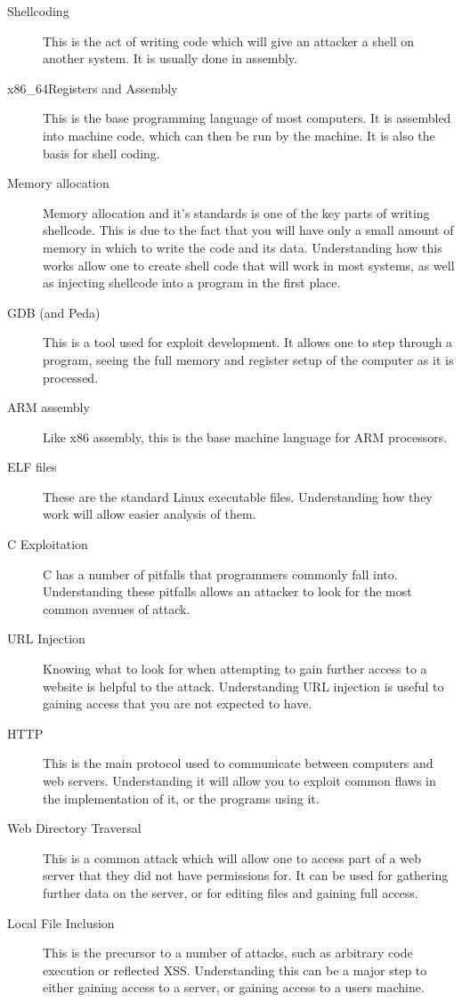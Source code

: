 \documentclass[twoside,a4paper,11pt]{report}
\begin{document}
			\begin{description}
				\item[Shellcoding]
					This is the act of writing code which will give an attacker a shell on another system. 
					It is usually done in assembly. 
				\item[x86\_64Registers and Assembly] 
					This is the base programming language of most computers. 
					It is assembled into machine code, which can then be run by the machine. 
					It is also the basis for shell coding. 
				\item[Memory allocation] 
					Memory allocation and it's standards is one of the key parts of writing shellcode. 
					This is due to the fact that you will have only a small amount of memory in which to write the code and its data. 
					Understanding how this works allow one to create shell code that will work in most systems, as well as injecting shellcode into a program in the first place. 
				\item[GDB (and Peda)]
					This is a tool used for exploit development. 
					It allows one to step through a program, seeing the full memory and register setup of the computer as it is processed. 
				\item[ARM assembly]
					Like x86 assembly, this is the base machine language for ARM processors. 
				\item[ELF files]
					These are the standard Linux executable files. 
					Understanding how they work will allow easier analysis of them. 
				\item[C Exploitation]
					C has a number of pitfalls that programmers commonly fall into. 
					Understanding these pitfalls allows an attacker to look for the most common avenues of attack. 
				\item[URL Injection]
					Knowing what to look for when attempting to gain further access to a website is helpful to the attack. 
					Understanding URL injection is useful to gaining access that you are not expected to have. 
				\item[HTTP] 
					This is the main protocol used to communicate between computers and web servers. 
					Understanding it will allow you to exploit common flaws in the implementation of it, or the programs using it. 
				\item[Web Directory Traversal] 
					This is a common attack which will allow one to access part of a web server that they did not have permissions for. 
					It can be used for gathering further data on the server, or for editing files and gaining full access. 
				\item[Local File Inclusion]
					This is the precursor to a number of attacks, such as arbitrary code execution or reflected XSS. 
					Understanding this can be a major step to either gaining access to a server, or gaining access to a users machine. 
			\end{description}
\end{document}
